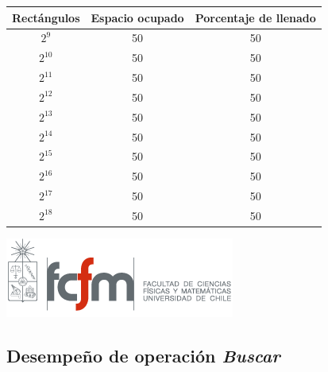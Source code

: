 \documentclass[letterpaper,10pt]{article}
\begin{document}
	\begin{center}

		\begin{tabular}{|c|c|c|}
			\hline
			Rectángulos	& Espacio ocupado & Porcentaje de llenado\\
			\hline
			$2^{9}$ 	& 50 	& 50\\
			\hline
			$2^{10}$ 	& 50 	& 50\\
			\hline
			$2^{11}$ 	& 50 	& 50\\
			\hline
			$2^{12}$ 	& 50 	& 50\\
			\hline
			$2^{13}$ 	& 50 	& 50\\
			\hline
			$2^{14}$ 	& 50 	& 50\\
			\hline
			$2^{15}$ 	& 50 	& 50\\
			\hline
			$2^{16}$ 	& 50 	& 50\\
			\hline
			$2^{17}$ 	& 50 	& 50\\
			\hline
			$2^{18}$ 	& 50 	& 50\\
			\hline
		\end{tabular}

		\includegraphics{logoFCFM.png}
	\end{center}

	\subsection{Desempeño de operación \textit{Buscar}}
\end{document}
